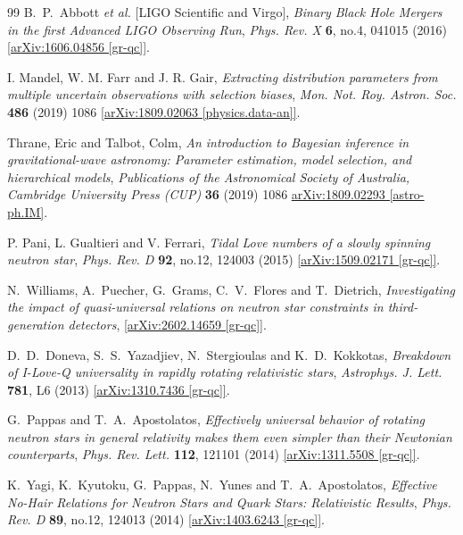 \documentclass[11pt]{article}
\begin{document}
\begin{thebibliography}{99}
    B.~P.~Abbott \textit{et al.} [LIGO Scientific and Virgo],
    \emph{Binary Black Hole Mergers in the first Advanced LIGO Observing Run},
    \emph{Phys. Rev. X} {\textbf{6}}, no.4, 041015 (2016) \href{https://arxiv.org/pdf/1606.04856}{[arXiv:1606.04856 [gr-qc]]}.

    
    I. Mandel, W. M. Farr and J. R. Gair,
    \emph{Extracting distribution parameters from multiple uncertain observations with selection biases},
    \emph{Mon. Not. Roy. Astron. Soc.} {\bf 486} (2019) 1086 \href{https://arxiv.org/pdf/1809.02063}{[arXiv:1809.02063 [physics.data-an]]}.
    
    Thrane, Eric and Talbot, Colm,
    \emph{An introduction to Bayesian inference in gravitational-wave astronomy: Parameter estimation, model selection, and hierarchical models},
    \emph{Publications of the Astronomical Society of Australia, Cambridge University Press (CUP)} {\bf 36} (2019) 1086 \href{https://arxiv.org/pdf/1809.02293}{arXiv:1809.02293 [astro-ph.IM]}.

    P. Pani, L. Gualtieri and V. Ferrari,
    \emph{Tidal Love numbers of a slowly spinning neutron star},
    \emph{Phys. Rev. D} {\textbf{92}}, no.12, 124003 (2015) \href{https://arxiv.org/pdf/1509.02171}{[arXiv:1509.02171 [gr-qc]]}.

    N.~Williams, A.~Puecher, G.~Grams, C.~V.~Flores and T.~Dietrich,
    \emph{Investigating the impact of quasi-universal relations on neutron star constraints in third-generation detectors},
    \href{https://arxiv.org/pdf/2602.14659}{[arXiv:2602.14659 [gr-qc]]}.

    D.~D.~Doneva, S.~S.~Yazadjiev, N.~Stergioulas and K.~D.~Kokkotas,
    \emph{Breakdown of I-Love-Q universality in rapidly rotating relativistic stars},
    \emph{Astrophys. J. Lett.} {\textbf{781}}, L6 (2013) \href{https://arxiv.org/pdf/1310.7436}{[arXiv:1310.7436 [gr-qc]]}.

    G.~Pappas and T.~A.~Apostolatos,
    \emph{Effectively universal behavior of rotating neutron stars in general relativity makes them even simpler than their Newtonian counterparts},
    \emph{Phys. Rev. Lett.} \textbf{112}, 121101 (2014) \href{https://arxiv.org/pdf/1311.5508}{[arXiv:1311.5508 [gr-qc]]}.

    K.~Yagi, K.~Kyutoku, G.~Pappas, N.~Yunes and T.~A.~Apostolatos,
    \emph{Effective No-Hair Relations for Neutron Stars and Quark Stars: Relativistic Results},
    \emph{Phys. Rev. D} \textbf{89}, no.12, 124013 (2014) \href{https://arxiv.org/pdf/1403.6243}{[arXiv:1403.6243 [gr-qc]]}.


\end{thebibliography}
\end{document}
